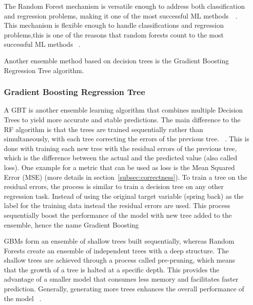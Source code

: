 The Random Forest mechanism is versatile enough to address both classification and regression problems, making it one
of the most successful
\ac{ML} methods~\cite[pp. 3--4]{biau2016random}~\cite[p. 25]{breiman2001random}.
This mechanism is flexible enough to handle classifications and regression problems,this is one of the reasons that
random forests count to the most successful \ac{ML}
methods
~\cite[pp. 1--4]{biau2016random}.

Another ensemble method based on decision trees is the Gradient Boosting Regression Tree algorithm.

\subsubsection{Gradient Boosting Regression Tree}

A \ac{GBT} is another ensemble learning algorithm that combines multiple Decision Trees
to yield more accurate and stable predictions.
The main difference to the \ac{RF} algorithm is that the trees are trained sequentially
rather than simultaneously, with each tree correcting the errors of the previous tree.
~\cite[pp. 88--89]{muller2016introduction}.
This is done with training each new tree with the residual errors of the previous tree, which is the
difference between the actual and the predicted value (also called loss).
One example for a metric that can be used as loss is the Mean Squared Error (MSE) (more details in
section~\ref{subsec:correctness}).
To train a tree on the residual errors, the process is similar to train a decision tree on any other regression
task.
Instead of using the original target variable (spring back) as the label for the training data instead the
residual errors are used.
This process sequentially boost the performance of the model with new tree added to the
ensemble, hence the name Gradient Boosting
~\cite[p. 222]{boehmke2019hands}

GBMs form an ensemble of shallow trees built sequentially, whereas Random Forests create an ensemble of independent
trees with a deep structure.
The shallow trees are achieved through a process called pre-pruning, which means that the growth of a tree is halted
at a specific depth.
This provides the advantage of a smaller model that consumes less memory and facilitates faster prediction.
Generally, generating more trees enhances the overall performance of the
model
~\cite[pp. 74, 88--89]{muller2016introduction}.

